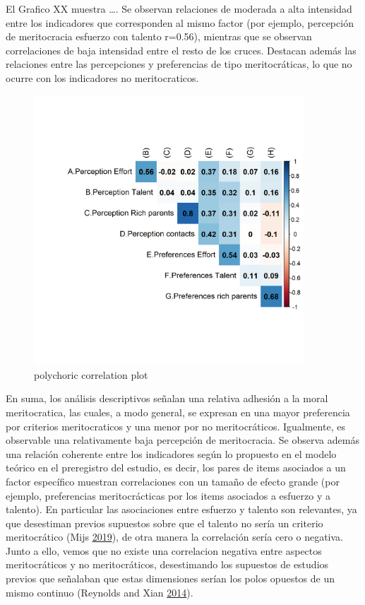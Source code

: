 \documentclass[
]{article}
\begin{document}
\pagebreak

El Grafico XX muestra \ldots. Se observan relaciones de moderada a alta
intensidad entre los indicadores que corresponden al mismo factor (por
ejemplo, percepción de meritocracia esfuerzo con talento r=0.56),
mientras que se observan correlaciones de baja intensidad entre el resto
de los cruces. Destacan además las relaciones entre las percepciones y
preferencias de tipo meritocráticas, lo que no ocurre con los
indicadores no meritocraticos.

\begin{figure}
\centering
\includegraphics[width=0.9\textwidth,height=\textheight]{../output/images/corpoly.png}
\caption{polychoric correlation plot}
\end{figure}

En suma, los análisis descriptivos señalan una relativa adhesión a la
moral meritocratica, las cuales, a modo general, se expresan en una
mayor preferencia por criterios meritocraticos y una menor por no
meritocráticos. Igualmente, es observable una relativamente baja
percepción de meritocracia. Se observa además una relación coherente
entre los indicadores según lo propuesto en el modelo teórico en el
preregistro del estudio, es decir, los pares de items asociados a un
factor específico muestran correlaciones con un tamaño de efecto grande
(por ejemplo, preferencias meritocrácticas por los items asociados a
esfuerzo y a talento). En particular las asociaciones entre esfuerzo y
talento son relevantes, ya que desestiman previos supuestos sobre que el
talento no sería un criterio meritocrático (Mijs
\protect\hyperlink{ref-mijs_paradox_2019}{2019}), de otra manera la
correlación sería cero o negativa. Junto a ello, vemos que no existe una
correlacion negativa entre aspectos meritocráticos y no meritocráticos,
desestimando los supuestos de estudios previos que señalaban que estas
dimensiones serían los polos opuestos de un mismo continuo (Reynolds and
Xian \protect\hyperlink{ref-reynolds_perceptions_2014}{2014}).
\end{document}
